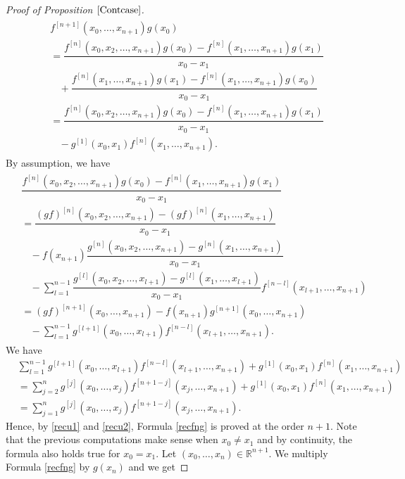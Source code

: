 \documentclass[12pt]{amsart}
\theoremstyle{remark}
\begin{document}
\begin{proof}[Proof of Proposition $\ref{Contcase}$]
\begin{align}
\begin{split}
& f^{[n+1]}(x_0,\ldots, x_{n+1})g(x_0) \\
& = \dfrac{f^{[n]}(x_0, x_2, \ldots, x_{n+1})g(x_0) - f^{[n]}(x_1,\ldots, x_{n+1})g(x_1)}{x_0-x_1} \\
& \ \ \ \ + \dfrac{f^{[n]}(x_1,\ldots, x_{n+1})g(x_1) - f^{[n]}(x_1,\ldots, x_{n+1})g(x_0)}{x_0-x_1} \\
& = \dfrac{f^{[n]}(x_0, x_2, \ldots, x_{n+1})g(x_0) - f^{[n]}(x_1,\ldots, x_{n+1})g(x_1)}{x_0-x_1} \\
& \ \ \ \ - g^{[1]}(x_0,x_1) f^{[n]}(x_1,\ldots, x_{n+1}).
\end{split}
\end{align}
By assumption, we have
\begin{align}\label{recu2}
\begin{split}
& \dfrac{f^{[n]}(x_0, x_2, \ldots, x_{n+1})g(x_0) - f^{[n]}(x_1,\ldots, x_{n+1})g(x_1)}{x_0-x_1} \\
& = \dfrac{(gf)^{[n]}(x_0, x_2, \ldots, x_{n+1}) - (gf)^{[n]}(x_1, \ldots, x_{n+1})}{x_0-x_1} \\
& \ \ \ \ - f(x_{n+1}) \dfrac{g^{[n]}(x_0,x_2,\ldots, x_{n+1}) - g^{[n]}(x_1,\ldots, x_{n+1})}{x_0-x_1} \\
& \ \ \ \ - \sum_{l=1}^{n-1} \dfrac{g^{[l]}(x_0,x_2, \ldots, x_{l+1})-g^{[l]}(x_1, \ldots, x_{l+1})}{x_0-x_1}f^{[n-l]}(x_{l+1} ,\ldots, x_{n+1}) \\
& = (gf)^{[n+1]}(x_0, \ldots, x_{n+1}) - f(x_{n+1}) g^{[n+1]}(x_0,\ldots, x_{n+1}) \\
& \ \ \ \ - \sum_{l=1}^{n-1} g^{[l+1]}(x_0, \ldots, x_{l+1}) f^{[n-l]}(x_{l+1} ,\ldots, x_{n+1}).
\end{split}
\end{align}
We have
\begin{align*}
& \sum_{l=1}^{n-1} g^{[l+1]}(x_0, \ldots, x_{l+1}) f^{[n-l]}(x_{l+1} ,\ldots, x_{n+1}) + g^{[1]}(x_0,x_1) f^{[n]}(x_1,\ldots, x_{n+1}) \\
& = \sum_{j=2}^{n} g^{[j]}(x_0, \ldots, x_j) f^{[n+1-j]}(x_j ,\ldots, x_{n+1}) + g^{[1]}(x_0,x_1) f^{[n]}(x_1,\ldots, x_{n+1}) \\
& = \sum_{j=1}^{n} g^{[j]}(x_0, \ldots, x_j) f^{[n+1-j]}(x_j ,\ldots, x_{n+1}).
\end{align*}
Hence, by \eqref{recu1} and \eqref{recu2}, Formula \eqref{recfng} is proved at the order $n+1$. Note that the previous computations make sense when $x_0 \neq x_1$ and by continuity, the formula also holds true for $x_0 = x_1$. Let $(x_0, \ldots, x_n)\in \mathbb{R}^{n+1}$. We multiply Formula \eqref{recfng} by $g(x_n)$ and we get

\end{proof}
\end{document}
